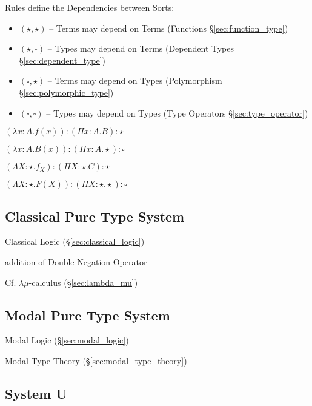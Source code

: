Rules define the Dependencies between Sorts:
\begin{itemize}
  \item $(\star,\star)$ -- Terms may depend on Terms (Functions
    \S\ref{sec:function_type})
  \item $(\star,\square)$ -- Types may depend on Terms (Dependent
    Types \S\ref{sec:dependent_type})
  \item $(\square,\star)$ -- Terms may depend on Types (Polymorphism
    \S\ref{sec:polymorphic_type})
  \item $(\square,\square)$ -- Types may depend on Types (Type
    Operators \S\ref{sec:type_operator})
\end{itemize}

$(\lambda x:A.f(x)):(\Pi x:A.B):\star$

$(\lambda x:A.B(x)):(\Pi x:A.\star):\square$

$(\Lambda X:\star.f_X):(\Pi X:\star.C):\star$

$(\Lambda X:\star.F(X)):(\Pi X:\star.\star):\square$



\subsection{Classical Pure Type System}\label{sec:cpts}

Classical Logic (\S\ref{sec:classical_logic})

addition of Double Negation Operator

\fist Cf. $\lambda\mu$-calculus (\S\ref{sec:lambda_mu})



\subsection{Modal Pure Type System}\label{sec:mpts}

Modal Logic (\S\ref{sec:modal_logic})

Modal Type Theory (\S\ref{sec:modal_type_theory})



\subsection{System U}\label{sec:system_u}

